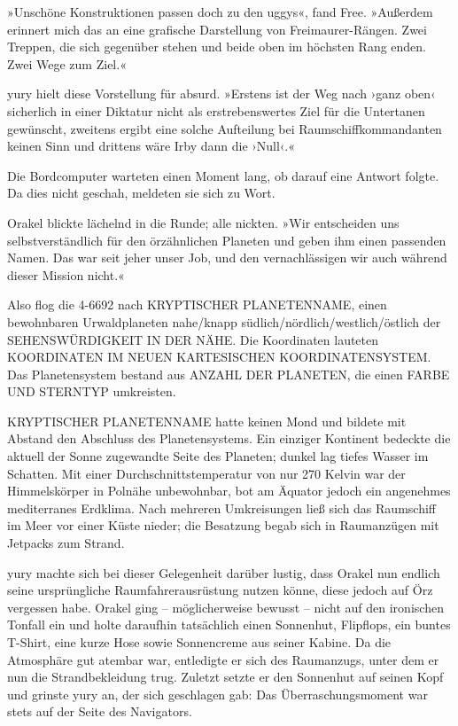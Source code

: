 »Unschöne Konstruktionen passen doch zu den uggys«, fand Free. »Außerdem erinnert mich das an eine grafische Darstellung von Freimaurer-Rängen. Zwei Treppen, die sich gegenüber stehen und beide oben im höchsten Rang enden. Zwei Wege zum Ziel.«

yury hielt diese Vorstellung für absurd. »Erstens ist der Weg nach ›ganz oben‹ sicherlich in einer Diktatur nicht als erstrebenswertes Ziel für die Untertanen gewünscht, zweitens ergibt eine solche Aufteilung bei Raumschiffkommandanten keinen Sinn und drittens wäre Irby dann die ›Null‹.«

Die Bordcomputer warteten einen Moment lang, ob darauf eine Antwort folgte. Da dies nicht geschah, meldeten sie sich zu Wort. 

Orakel blickte lächelnd in die Runde; alle nickten. »Wir entscheiden uns selbstverständlich für den örzähnlichen Planeten und geben ihm einen passenden Namen. Das war seit jeher unser Job, und den vernachlässigen wir auch während dieser Mission nicht.«

Also flog die 4-6692 nach
KRYPTISCHER PLANETENNAME, %
einen bewohnbaren Urwaldplaneten nahe/knapp südlich/nördlich/westlich/östlich der
SEHENSWÜRDIGKEIT IN DER NÄHE. %
Die Koordinaten lauteten
KOORDINATEN IM NEUEN KARTESISCHEN KOORDINATENSYSTEM. %
Das Planetensystem bestand aus
ANZAHL DER PLANETEN, %
die einen
FARBE UND STERNTYP %
umkreisten.

KRYPTISCHER PLANETENNAME %
hatte keinen Mond und bildete mit Abstand den Abschluss des Planetensystems. Ein einziger Kontinent bedeckte die aktuell der Sonne zugewandte Seite des Planeten; dunkel lag tiefes Wasser im Schatten. Mit einer Durchschnittstemperatur von nur 270 Kelvin war der Himmelskörper in Polnähe unbewohnbar, bot am Äquator jedoch ein angenehmes mediterranes Erdklima. Nach mehreren Umkreisungen ließ sich das Raumschiff im Meer vor einer Küste nieder; die Besatzung begab sich in Raumanzügen mit Jetpacks zum Strand.

yury machte sich bei dieser Gelegenheit darüber lustig, dass Orakel nun endlich seine ursprüngliche Raumfahrerausrüstung nutzen könne, diese jedoch auf Örz vergessen habe. Orakel ging – möglicherweise bewusst – nicht auf den ironischen Tonfall ein und holte daraufhin tatsächlich einen Sonnenhut, Flipflops, ein buntes T-Shirt, eine kurze Hose sowie Sonnencreme aus seiner Kabine. Da die Atmosphäre gut atembar war, entledigte er sich des Raumanzugs, unter dem er nun die Strandbekleidung trug. Zuletzt setzte er den Sonnenhut auf seinen Kopf und grinste yury an, der sich geschlagen gab: Das Überraschungsmoment war stets auf der Seite des Navigators.

